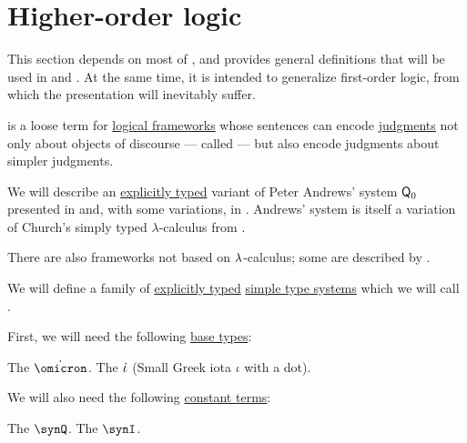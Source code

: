 \section{Higher-order logic}\label{sec:higher_order_logic}

This section depends on most of , and provides general definitions that will be used in  and . At the same time, it is intended to generalize first-order logic, from which the presentation will inevitably suffer.

\begin{concept}\label{con:higher_order_logic}
   is a loose term for \hyperref[def:logical_framework]{logical frameworks} whose sentences can encode \hyperref[con:judgment]{judgments} not only about objects of discourse --- called  --- but also encode judgments about simpler judgments.

  We will describe an \hyperref[con:explicit_and_implicit_typing]{explicitly typed} variant of Peter Andrews' system \( \textsf{Q}_0 \) presented in \cite[\S 51]{Andrews2002Logic} and, with some variations, in . Andrews' system is itself a variation of Church's simply typed \( \lambda \)-calculus from \cite{Church1940STT}.

  There are also frameworks not based on \( \mathrm{\lambda} \)-calculus; some are described by .
\end{concept}

\begin{definition}\label{def:simply_typed_hol}\mimprovised
  We will define a family of \hyperref[con:explicit_and_implicit_typing]{explicitly typed} \hyperref[def:simple_type_system]{simple type systems} which we will call .

  First, we will need the following \hyperref[def:simple_type]{base types}:
  \begin{thmenum}[series=def:simply_typed_hol]
     The  \( \syn\omicron \).
     The  \( \dot{\iota} \) (Small Greek iota \( \iota \) with a dot).
  \end{thmenum}

  We will also need the following \hyperref[def:lambda_term]{constant terms}:
  \begin{thmenum}[resume=def:simply_typed_hol]
     The  \( \synQ \).
     The  \( \synI \).
  \end{thmenum}
\end{definition}

\begin{definition}\label{def:nth_order_logic}
\end{definition}
